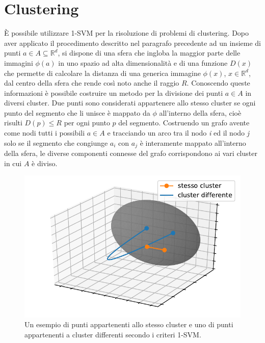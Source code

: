 \documentclass [11pt,a4paper,twoside,openright] {book}
\begin{document}
\section{Clustering}
È possibile utilizzare 1-SVM per la risoluzione di problemi di clustering. Dopo aver applicato il procedimento descritto nel paragrafo precedente ad un insieme di punti $a \in A \subseteq \mathbb{R}^d$, si dispone di una sfera che ingloba la maggior parte delle immagini $\phi(a)$ in uno spazio ad alta dimensionalità e di una funzione $D(x)$ che permette di calcolare la distanza di una generica immagine $\phi(x)$, $ x  \in \mathbb{R}^d$, dal centro della sfera che rende così noto anche il raggio $R$. Conoscendo queste informazioni è possibile costruire un metodo per la divisione dei punti $a \in A$ in diversi cluster\cite{ben2001support}. Due punti sono considerati appartenere allo stesso cluster se ogni punto del segmento che li unisce è mappato da $\phi$ all'interno della sfera, cioè risulti $D(p) \leq R$ per ogni punto $p$ del segmento. Costruendo un grafo avente come nodi tutti i possibili $a \in A$ e tracciando un arco tra il nodo \textit{i} ed  il nodo \textit{j} solo se il segmento che congiunge $a_i$ con $a_j$ è interamente mappato all'interno della sfera, le diverse componenti connesse del grafo corrispondono ai vari cluster in cui $A$ è diviso.
\begin{figure}[!h]
\centering
\includegraphics[scale=.6]{figure/clustering.pdf}
\caption{Un esempio di punti appartenenti allo stesso cluster e uno di punti appartenenti a cluster differenti secondo i criteri 1-SVM. \label{outliers}}
\end{figure}


\end{document}
